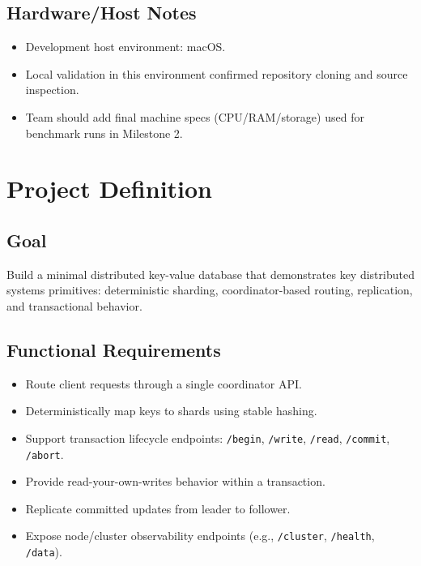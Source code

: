 \documentclass[11pt]{article}
\begin{document}
\subsection*{Hardware/Host Notes}
\begin{itemize}[leftmargin=1.2em]
    \item Development host environment: macOS.
    \item Local validation in this environment confirmed repository cloning and source inspection.
    \item Team should add final machine specs (CPU/RAM/storage) used for benchmark runs in Milestone 2.
\end{itemize}

\section{Project Definition}
\subsection*{Goal}
Build a minimal distributed key-value database that demonstrates key distributed systems primitives: deterministic sharding, coordinator-based routing, replication, and transactional behavior.

\subsection*{Functional Requirements}
\begin{itemize}[leftmargin=1.2em]
    \item Route client requests through a single coordinator API.
    \item Deterministically map keys to shards using stable hashing.
    \item Support transaction lifecycle endpoints: \texttt{/begin}, \texttt{/write}, \texttt{/read}, \texttt{/commit}, \texttt{/abort}.
    \item Provide read-your-own-writes behavior within a transaction.
    \item Replicate committed updates from leader to follower.
    \item Expose node/cluster observability endpoints (e.g., \texttt{/cluster}, \texttt{/health}, \texttt{/data}).
\end{itemize}
\end{document}
